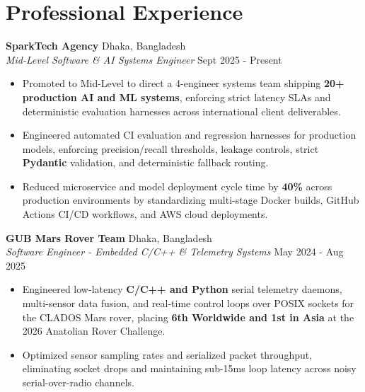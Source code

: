 \documentclass[9.5pt,a4paper]{article}
\begin{document}
\section*{Professional Experience}
\noindent
\textbf{SparkTech Agency} \hfill Dhaka, Bangladesh\\
\textit{Mid-Level Software & AI Systems Engineer} \hfill Sept 2025 - Present
\begin{itemize}
    \item Promoted to Mid-Level to direct a 4-engineer systems team shipping \textbf{20+ production AI and ML systems}, enforcing strict latency SLAs and deterministic evaluation harnesses across international client deliverables.
    \item Engineered automated CI evaluation and regression harnesses for production models, enforcing precision/recall thresholds, leakage controls, strict \textbf{Pydantic} validation, and deterministic fallback routing.
    \item Reduced microservice and model deployment cycle time by \textbf{40\%} across production environments by standardizing multi-stage Docker builds, GitHub Actions CI/CD workflows, and AWS cloud deployments.
\end{itemize}
\vspace{0.6pt}
\noindent
\textbf{GUB Mars Rover Team} \hfill Dhaka, Bangladesh\\
\textit{Software Engineer - Embedded C/C++ & Telemetry Systems} \hfill May 2024 - Aug 2025
\begin{itemize}
    \item Engineered low-latency \textbf{C/C++ and Python} serial telemetry daemons, multi-sensor data fusion, and real-time control loops over POSIX sockets for the CLADOS Mars rover, placing \textbf{6th Worldwide and 1st in Asia} at the 2026 Anatolian Rover Challenge.
    \item Optimized sensor sampling rates and serialized packet throughput, eliminating socket drops and maintaining sub-15ms loop latency across noisy serial-over-radio channels.
\end{itemize}
\vspace{0.6pt}
\end{document}
